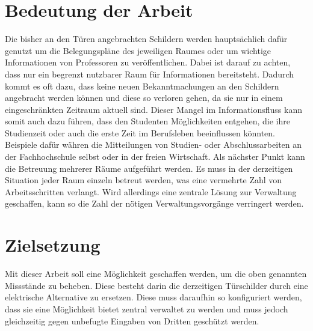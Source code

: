 \begin{flushleft}
\section{Bedeutung der Arbeit}
\label{sec:Bedeutung der Arbeit}
Die bisher an den Türen angebrachten Schildern werden hauptsächlich dafür genutzt um die Belegungspläne des jeweiligen Raumes oder um wichtige Informationen von Professoren zu veröffentlichen. Dabei ist darauf zu achten, dass nur ein begrenzt nutzbarer Raum für Informationen bereitsteht. Dadurch kommt es oft dazu, dass keine neuen Bekanntmachungen an den Schildern angebracht werden können und diese so verloren gehen, da sie nur in einem eingeschränkten Zeitraum aktuell sind. Dieser Mangel im Informationsfluss kann somit auch dazu führen, dass den Studenten Möglichkeiten entgehen, die ihre Studienzeit oder auch die erste Zeit im Berufsleben beeinflussen könnten. Beispiele dafür währen die Mitteilungen von Studien- oder Abschlussarbeiten an der Fachhochschule selbst oder in der freien Wirtschaft. 
Als nächster Punkt kann die Betreuung mehrerer Räume aufgeführt werden. Es muss in der derzeitigen Situation jeder Raum einzeln betreut werden, was eine vermehrte Zahl von Arbeitsschritten verlangt. Wird allerdings eine zentrale Lösung zur Verwaltung geschaffen, kann so die Zahl der nötigen Verwaltungsvorgänge verringert werden. 

\section{Zielsetzung}
\label{sec:Zielsetzung}
Mit dieser Arbeit soll eine Möglichkeit geschaffen werden, um die oben genannten Missstände zu beheben. Diese besteht darin die derzeitigen Türschilder durch eine elektrische Alternative zu ersetzen. Diese muss daraufhin so konfiguriert werden, dass sie eine Möglichkeit bietet zentral verwaltet zu werden und muss jedoch gleichzeitig gegen unbefugte Eingaben von Dritten geschützt werden. 

\end{flushleft}
